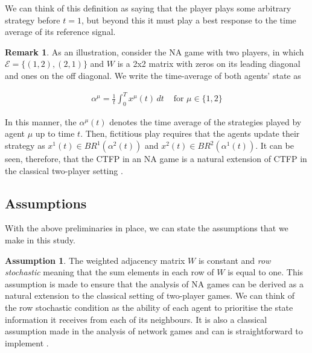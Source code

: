 \documentclass{article}
\theoremstyle{definition}
\newtheorem{assumption}{Assumption}
\newtheorem*{remark}{Remark}
\newcommand{\edgeset}{\mathcal{E}}
\newcommand{\weightset}{W}
\newcommand{\xmu}{x^{\mu}}
\begin{document}
  We can think of this definition as saying that the player plays some arbitrary strategy before
  $t = 1$, but beyond this it must play a best response to the time average of its reference
  signal.
  
  \begin{remark}
    As an illustration, consider the NA game with two players, in which $\edgeset = \{(1, 2),
    (2, 1)\}$ and $\weightset$ is a 2x2 matrix with zeros on its leading diagonal and ones on
    the off diagonal. We write the time-average of both agents' state as
  
    \begin{align}
      \alpha^\mu = \frac{1}{t} \int_0^T \xmu(t) \, dt & \text{ for $\mu \in \{1, 2\}$}
    \end{align}

    In this manner, the $\alpha^\mu(t)$ denotes the time average of the strategies played by
    agent $\mu$ up to time $t$. Then, fictitious play requires that the agents update their
    strategy as $x^1(t) \in BR^1(\alpha^2(t))$ and $x^2(t) \in BR^2(\alpha^1(t))$. It can be
    seen, therefore, that the CTFP in an NA game is a natural extension of CTFP in the classical
    two-player setting \cite{}.
  \end{remark}

\subsection{Assumptions}

  With the above preliminaries in place, we can state the assumptions that we make in this study.

  \begin{assumption}
    The weighted adjacency matrix $\weightset$ is constant and \emph{row stochastic} meaning
    that the sum elements in each row of $\weightset$ is equal to one. This assumption is
    made to ensure that the analysis of NA games can be derived as a natural extension to the
    classical setting of two-player games. We can think of the row stochastic condition as the
    ability of each agent to prioritise the state information it receives from each of its
    neighbours. It is also a classical assumption made in the analysis of network games
    \cite{one of the network game papers} and can is straightforward to implement \cite{Eyad}.
  \end{assumption}
\end{document}
